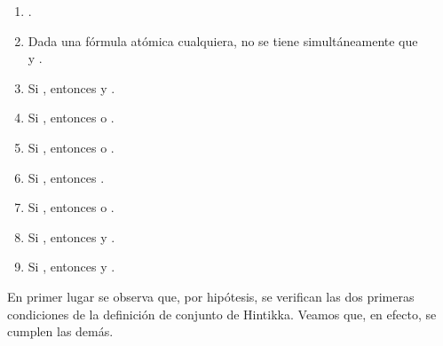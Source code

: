 \begin{isabellebody}
\begin{isamarkuptext}
\begin{demostracion}
  \begin{enumerate}
    \item {}.
    \item Dada  una fórmula atómica cualquiera, no se tiene 
      simultáneamente que\\  y .
    \item Si , entonces  y .
    \item Si , entonces  o .
    \item Si , entonces  o .
    \item Si , entonces .
    \item Si , entonces  o .
    \item Si , entonces  y . 
    \item Si , entonces  y . 
  \end{enumerate} 

  En primer lugar se observa que, por hipótesis, se verifican las dos primeras
  condiciones de la definición de conjunto de Hintikka. Veamos que, en efecto, se
  cumplen las demás.


\end{demostracion}
\end{isamarkuptext}
\end{isabellebody}
